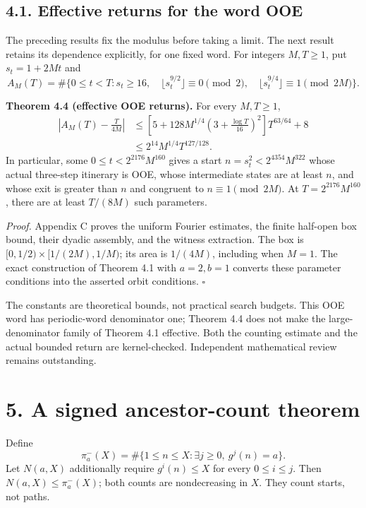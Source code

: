 \documentclass[11pt,a4paper]{article}
\begin{document}
\subsection{4.1. Effective returns for the word
OOE}\label{effective-returns-for-the-word-ooe}

The preceding results fix the modulus before taking a limit. The next
result retains its dependence explicitly, for one fixed word. For
integers \(M,T\ge1\), put \(s_t=1+2Mt\) and \[
A_M(T)=\#\{0\le t<T:s_t\ge16,\quad
 \lfloor s_t^{9/2}\rfloor\equiv0\pmod2,\quad
 \lfloor s_t^{9/4}\rfloor\equiv1\pmod{2M}\}.
\]

\textbf{Theorem 4.4 (effective OOE returns).} For every \(M,T\ge1\), \[
\begin{split}
\left|A_M(T)-\frac{T}{4M}\right|
&\le\left[5+128M^{1/4}\left(3+\frac{\log T}{16}\right)^2\right]T^{63/64}+8\\
&\le2^{14}M^{1/4}T^{127/128}.
\end{split}
\tag{4.7}
\] In particular, some \(0\le t<2^{2176}M^{160}\) gives a start
\(n=s_t^2<2^{4354}M^{322}\) whose actual three-step itinerary is OOE,
whose intermediate states are at least \(n\), and whose exit is greater
than \(n\) and congruent to \(n\equiv1\pmod{2M}\). At
\(T=2^{2176}M^{160}\), there are at least \(T/(8M)\) such parameters.

\emph{Proof.} Appendix C proves the uniform Fourier estimates, the
finite half-open box bound, their dyadic assembly, and the witness
extraction. The box is \([0,1/2)\times[1/(2M),1/M)\); its area is
\(1/(4M)\), including when \(M=1\). The exact construction of Theorem
4.1 with \(a=2,b=1\) converts these parameter conditions into the
asserted orbit conditions. \(\square\)

The constants are theoretical bounds, not practical search budgets. This
OOE word has periodic-word denominator one; Theorem 4.4 does not make
the large-denominator family of Theorem 4.1 effective. Both the counting
estimate and the actual bounded return are kernel-checked. Independent
mathematical review remains outstanding.

\section{5. A signed ancestor-count
theorem}\label{a-signed-ancestor-count-theorem}

Define \[
\pi^-_a(X)=\#\{1\le n\le X:\exists j\ge0,\ g^j(n)=a\}.
\] Let \(N(a,X)\) additionally require \(g^i(n)\le X\) for every
\(0\le i\le j\). Then \(N(a,X)\le\pi^-_a(X)\); both counts are
nondecreasing in \(X\). They count starts, not paths.
\end{document}
